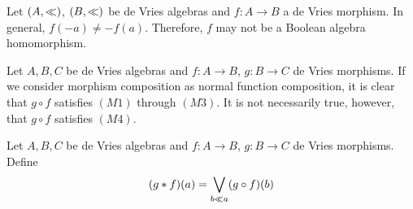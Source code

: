 \begin{remark}
	Let \( (A,\ll) \), \( (B,\ll) \) be de Vries algebras and \( f:A \to B \) a de Vries morphism.  In general, \( f(-a) \neq -f(a) \).  Therefore, \( f \) may not be a Boolean algebra homomorphism.
\end{remark}

\begin{remark}
	Let \( A,B,C \) be de Vries algebras and \( f:A \to B \), \( g:B \to C \) de Vries morphisms.  If we consider morphism composition as normal function composition, it is clear that \( g \circ f \) satisfies \( (M1) \) through \( (M3) \).  It is not necessarily true, however, that \( g \circ f \) satisfies \( (M4) \).
\end{remark}

\begin{definition}
	\label{mast}
	Let \( A,B,C \) be de Vries algebras and \( f:A \to B \), \( g:B \to C \) de Vries morphisms.  Define
	\[ (g \ast f)(a) = \bigvee_{b \ll a} (g \circ f)(b) \]
\end{definition}

